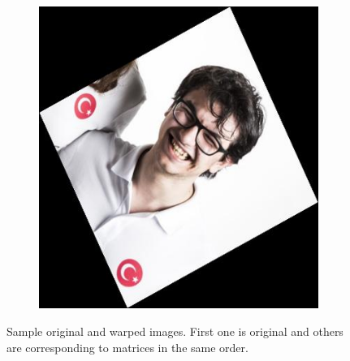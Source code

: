 \documentclass{article}
\begin{document}
\begin{figure}[!htb]
\begin{subfigure}{.25\textwidth}
\end{subfigure}
\begin{subfigure}{.25\textwidth}
  \centering
  \includegraphics[width=.99\textwidth]{ahmet8.jpg}
\end{subfigure}
\caption{Sample original and warped images. First one is original and others are corresponding to matrices in the same order.}
\end{figure}

\newpage
\end{document}
